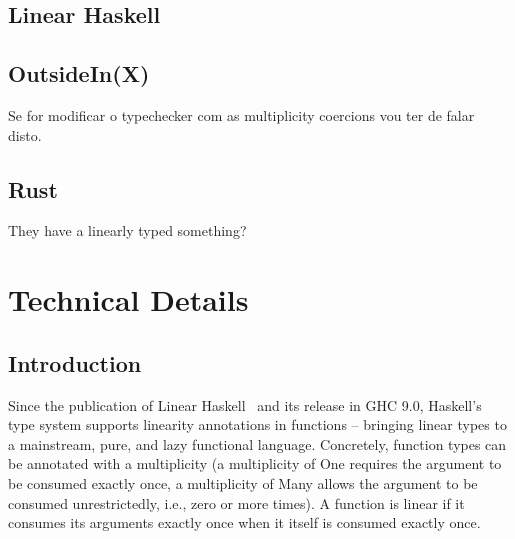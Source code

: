 \documentclass[a4paper, draft]{report}
\begin{document}
\section{Linear Haskell}

\section{OutsideIn(X)}

Se for modificar o typechecker com as multiplicity coercions vou ter de falar
disto.

\section{Rust}

They have a linearly typed something?

\chapter{Technical Details}




\section{Introduction}


Since the publication of Linear Haskell~\cite{linearhaskell} and its release in GHC 9.0,
Haskell's type system supports linearity annotations in functions -- bringing
linear types to a mainstream, pure, and lazy functional language. Concretely,
function types can be annotated with a multiplicity (a multiplicity of One
requires the argument to be consumed exactly once, a multiplicity of Many allows
the argument to be consumed unrestrictedly, i.e., zero or more times). A
function is linear if it consumes its arguments exactly once when it itself is
consumed exactly once.
\end{document}
